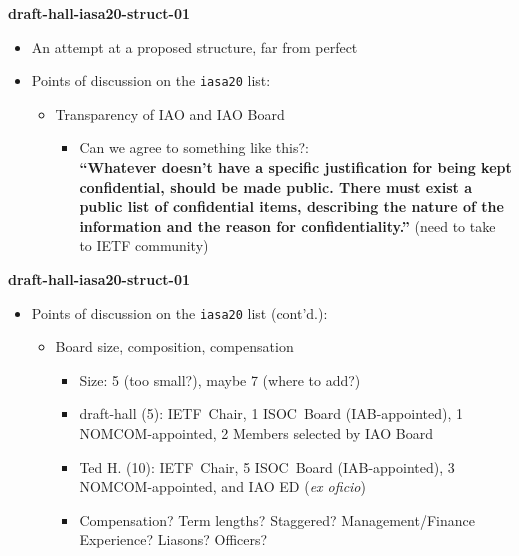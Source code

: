 \documentclass[helvetica]{seminar}
\newcommand{\heading}[1]{%
  \begin{center} 
    \large\bf 
    #1 
  \end{center} 
  \vspace{.4 in}}
\begin{document}
\begin{slide}

\heading{draft-hall-iasa20-struct-01}

\begin{itemize}
\item An attempt at a proposed structure, far from perfect
\item Points of discussion on the \texttt{iasa20} list:
  \begin{itemize}
  \item Transparency of IAO and IAO Board
    \begin{itemize}
    \item Can we agree to something like this?:\\\textbf{``Whatever
      doesn't have a specific justification for being kept
      confidential, should be made public.  There must exist a public
      list of confidential items, describing the nature of the
      information and the reason for confidentiality.''} (need to take
      to IETF community)
    \end{itemize}
  \end{itemize}
\end{itemize}

\end{slide}



\begin{slide}

\heading{draft-hall-iasa20-struct-01}

\begin{itemize}
\item Points of discussion on the \texttt{iasa20} list (cont'd.):
  \begin{itemize}
  \item Board size, composition, compensation
    \begin{itemize}
    \item Size: 5 (too small?), maybe 7 (where to add?)
    \item draft-hall (5): IETF~Chair, 1 ISOC~Board (IAB-appointed), 1
      NOMCOM-appointed, 2 Members selected by IAO Board
    \item Ted H. (10): IETF~Chair, 5 ISOC~Board (IAB-appointed), 3
      NOMCOM-appointed, and IAO ED (\textit{ex oficio})
    \item Compensation? Term lengths? Staggered? Management/Finance
      Experience? Liasons? Officers?
    \end{itemize}
  \end{itemize}
\end{itemize}

\end{slide}
\end{document}
